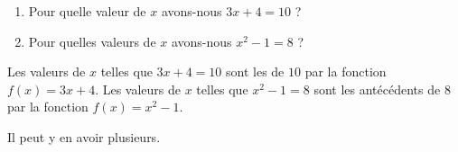 
\begin{exercice}\label{exoSeconde-0046}

    \begin{enumerate}
        \item
            Pour quelle valeur de \( x\) avons-nous \( 3x+4=10\) ?
        \item
            Pour quelles valeurs de \( x\) avons-nous \( x^2-1=8\) ?
    \end{enumerate}
    Les valeurs de \( x\) telles que \( 3x+4=10\) sont les  de \( 10\) par la fonction \( f(x)=3x+4\). Les valeurs de \( x\) telles que \( x^2-1=8\) sont les antécédents de \( 8\) par la fonction \( f(x)=x^2-1\).

    Il peut y en avoir plusieurs.

\end{exercice}
